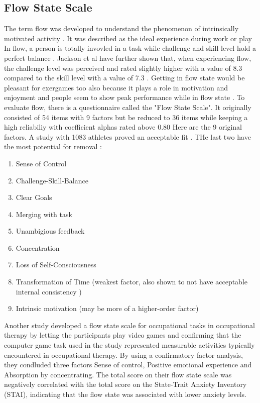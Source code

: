 \subsection{Flow State Scale}
The term flow was developed to understand the phenomenon of intrinsically motivated activity \cite{nakamura02concept}. It was described as the ideal experience during work or play \cite{csikszentmihalyi1992optimal} In flow, a person is totally invovled in a task while challenge and skill level hold a perfect balance \cite{jackson1998psychological}. Jackson et al have further shown that, when experiencing flow, the challenge level was perceived and rated slightly higher with a value of 8.3 compared to the skill level with a value of 7.3 \cite{jackson1996development}. Getting in flow state would be pleasant for exergames too also because it plays a role in motivation and enjoyment and people seem to show peak performance while in flow state \cite{jackson1996development, harris20review}.
To evaluate flow, there is a questionnaire called the "Flow State Scale". It originally consisted of 54 items with 9 factors but be reduced to 36 items while keeping a high reliabiliy with coefficient alphas rated above 0.80 \cite{jackson1996development} 
Here are the 9 original factors. A study with 1083 athletes proved an acceptable fit \cite{stavrou11confirmatory}. THe last two have the most potential for removal \cite{jackson1996development}:
\begin{enumerate}
	\item Sense of Control
	\item Challenge-Skill-Balance
	\item Clear Goals
	\item Merging with task
	\item Unambigious feedback
	\item Concentration
	\item Loss of Self-Consciousness
	\item Transformation of Time (weakest factor, also shown to not have acceptable internal consistency \cite{vlachopoulus00confirmatory})
	\item Intrinsic motivation (may be more of a higher-order factor)
\end{enumerate}

Another study developed a flow state scale for occupational tasks in occupational therapy by letting the participants play video games and confirming that the computer game task used in the study represented measurable activities typically encountered in occupational therapy. By using a confirmatory factor analysis, they condluded three factors Sense of control, Positive emotional experience and Absorption by concentrating.
The total score on their flow state scale was negatively correlated with the total score on the State-Trait Anxiety Inventory (STAI), indicating that the flow state was associated with lower anxiety levels.

